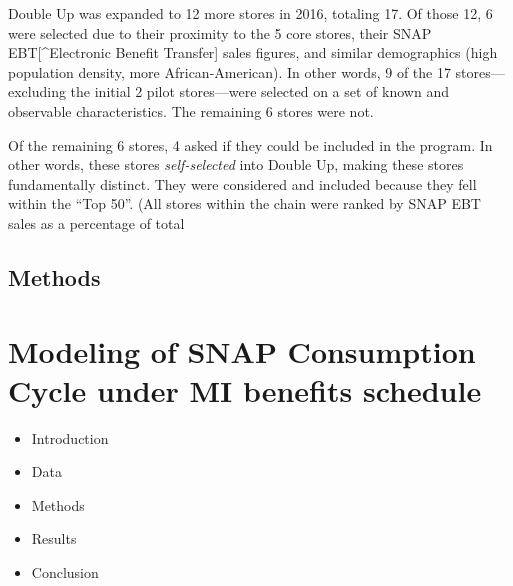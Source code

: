 \documentclass[11pt,letterpaperpaper,]{book}
\providecommand{\tightlist}{%
  \setlength{\itemsep}{0pt}\setlength{\parskip}{0pt}}
\begin{document}
Double Up was expanded to 12 more stores in 2016, totaling 17. Of those
12, 6 were selected due to their proximity to the 5 core stores, their
SNAP EBT{[}\^{}Electronic Benefit Transfer{]} sales figures, and similar
demographics (high population density, more African-American). In other
words, 9 of the 17 stores---excluding the initial 2 pilot stores---were
selected on a set of known and observable characteristics. The remaining
6 stores were not.

Of the remaining 6 stores, 4 asked if they could be included in the
program. In other words, these stores \emph{self-selected} into Double
Up, making these stores fundamentally distinct. They were considered and
included because they fell within the ``Top 50''. (All stores within the
chain were ranked by SNAP EBT sales as a percentage of total

\hypertarget{methods}{\section{Methods}\label{methods}}

\chapter{Modeling of SNAP Consumption Cycle under MI benefits
schedule}\label{snap-consumption}

\begin{itemize}
\tightlist
\item
  Introduction
\item
  Data
\item
  Methods
\item
  Results
\item
  Conclusion
\end{itemize}


\end{document}
